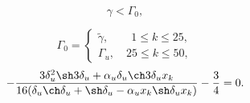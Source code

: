 \documentclass[fullscreen=true, unicode, bookmarks=false]{beamer}
\begin{document}
\begin{frame}
$$ \gamma<\Gamma_0, $$

\vfill

\begin{equation}\label{Gamma_0}
    \Gamma_0 =\left\{
                \begin{array}{ll}
                  \tilde{\gamma}, \qquad 1 \leqslant k \leqslant 25,\\
                  \Gamma_u, \quad 25 \leqslant k \leqslant 50,
                \end{array}
              \right.
\end{equation}
$$ -\frac{ 3\delta_u^2 \sh 3\delta_u + \alpha_u \delta_u \ch 3\delta_u x_k }{ 16( \delta_u \ch \delta_u +\sh \delta_u - \alpha_u x_k \sh \delta_u x_k ) } - \frac{3}{4} = 0.$$

\end{frame}
\end{document}
